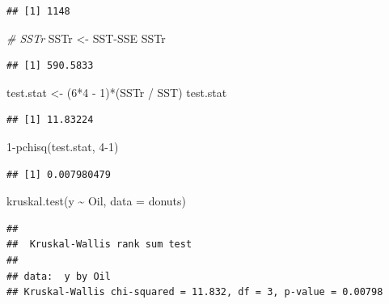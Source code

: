 \documentclass[
]{book}
\newenvironment{Shaded}{\begin{snugshade}}{\end{snugshade}}
\newcommand{\AttributeTok}[1]{\textcolor[rgb]{0.77,0.63,0.00}{#1}}
\newcommand{\CommentTok}[1]{\textcolor[rgb]{0.56,0.35,0.01}{\textit{#1}}}
\newcommand{\DecValTok}[1]{\textcolor[rgb]{0.00,0.00,0.81}{#1}}
\newcommand{\FunctionTok}[1]{\textcolor[rgb]{0.00,0.00,0.00}{#1}}
\newcommand{\NormalTok}[1]{#1}
\newcommand{\OtherTok}[1]{\textcolor[rgb]{0.56,0.35,0.01}{#1}}
\newcommand{\SpecialCharTok}[1]{\textcolor[rgb]{0.00,0.00,0.00}{#1}}
\begin{document}
\begin{verbatim}
## [1] 1148
\end{verbatim}

\begin{Shaded}
\begin{Highlighting}[]
\CommentTok{\# SSTr}
\NormalTok{SSTr }\OtherTok{\textless{}{-}}\NormalTok{ SST}\SpecialCharTok{{-}}\NormalTok{SSE}
\NormalTok{SSTr}
\end{Highlighting}
\end{Shaded}

\begin{verbatim}
## [1] 590.5833
\end{verbatim}

\begin{Shaded}
\begin{Highlighting}[]
\NormalTok{test.stat }\OtherTok{\textless{}{-}}\NormalTok{ (}\DecValTok{6}\SpecialCharTok{*}\DecValTok{4} \SpecialCharTok{{-}} \DecValTok{1}\NormalTok{)}\SpecialCharTok{*}\NormalTok{(SSTr }\SpecialCharTok{/}\NormalTok{ SST)}
\NormalTok{test.stat}
\end{Highlighting}
\end{Shaded}

\begin{verbatim}
## [1] 11.83224
\end{verbatim}

\begin{Shaded}
\begin{Highlighting}[]
\DecValTok{1}\SpecialCharTok{{-}}\FunctionTok{pchisq}\NormalTok{(test.stat, }\DecValTok{4{-}1}\NormalTok{)}
\end{Highlighting}
\end{Shaded}

\begin{verbatim}
## [1] 0.007980479
\end{verbatim}

\begin{Shaded}
\begin{Highlighting}[]
\FunctionTok{kruskal.test}\NormalTok{(y }\SpecialCharTok{\textasciitilde{}}\NormalTok{ Oil, }\AttributeTok{data =}\NormalTok{ donuts)}
\end{Highlighting}
\end{Shaded}

\begin{verbatim}
## 
##  Kruskal-Wallis rank sum test
## 
## data:  y by Oil
## Kruskal-Wallis chi-squared = 11.832, df = 3, p-value = 0.00798
\end{verbatim}
\end{document}
